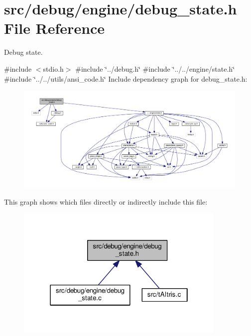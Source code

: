 \section{src/debug/engine/debug\+\_\+state.h File Reference}
\label{debug__state_8h}


Debug state.  


{\ttfamily \#include $<$stdio.\+h$>$}\newline
{\ttfamily \#include \char`\"{}../debug.\+h\char`\"{}}\newline
{\ttfamily \#include \char`\"{}../../engine/state.\+h\char`\"{}}\newline
{\ttfamily \#include \char`\"{}../../utils/ansi\+\_\+code.\+h\char`\"{}}\newline
Include dependency graph for debug\+\_\+state.\+h\+:
\nopagebreak
\begin{figure}[H]
\begin{center}
\leavevmode
\includegraphics[width=350pt]{debug__state_8h__incl}
\end{center}
\end{figure}
This graph shows which files directly or indirectly include this file\+:
\nopagebreak
\begin{figure}[H]
\begin{center}
\leavevmode
\includegraphics[width=286pt]{debug__state_8h__dep__incl}
\end{center}
\end{figure}
